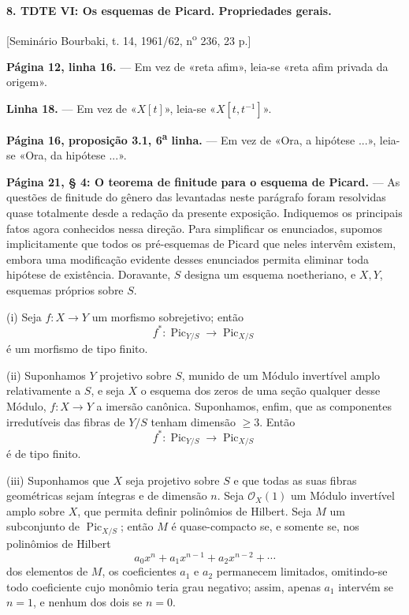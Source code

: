 \documentclass[11pt,twoside,openany]{book}
\numberwithin{equation}{section}
\newcommand{\src}[1]{%
  \phantomsection\hypertarget{src:#1}{}%
  \marginpar{\raggedleft\footnotesize\sffamily #1}%
}
\theoremstyle{plain}
\theoremstyle{definition}
\theoremstyle{remark}
\newcommand{\FgaUnitKey}{frontmatter}
\renewcommand{\src}[1]{%
  \phantomsection\hypertarget{src:\FgaUnitKey:#1}{}%
  \marginpar{\raggedleft\footnotesize\sffamily #1}%
}
\begin{document}
\noindent\textbf{8. TDTE VI: Os esquemas de Picard. Propriedades gerais.}

\begin{center}
[Seminário Bourbaki, t. 14, 1961/62, n\textsuperscript{o} 236, 23 p.]
\end{center}

\noindent\textbf{Página 12, linha 16.} --- Em vez de «reta afim», leia-se
«reta afim privada da origem».

\noindent\textbf{Linha 18.} --- Em vez de «$X[t]$», leia-se
«$X[t,t^{-1}]$».

\noindent\textbf{Página 16, proposição 3.1, 6\textsuperscript{a} linha.} ---
Em vez de «Ora, a hipótese ...», leia-se «Ora, da hipótese ...».

\noindent\textbf{Página 21, § 4: O teorema de finitude para o esquema de
Picard.} --- As questões de finitude do gênero das levantadas neste parágrafo
foram resolvidas quase totalmente desde a redação da presente exposição.
Indiquemos os principais fatos agora conhecidos nessa direção. Para simplificar
os enunciados, supomos implicitamente que todos os pré-esquemas de Picard que
neles intervêm existem, embora uma modificação evidente desses enunciados
permita eliminar toda hipótese de existência. Doravante, $S$ designa um esquema
noetheriano, e $X,Y$, esquemas próprios sobre $S$.

\medskip
\noindent(i) Seja $f:X\longrightarrow Y$ um morfismo sobrejetivo; então
\[
f^*: \operatorname{Pic}_{Y/S}\longrightarrow\operatorname{Pic}_{X/S}
\]
é um morfismo de tipo finito.
\src{304}
\noindent(ii) Suponhamos $Y$ projetivo sobre $S$, munido de um Módulo
invertível amplo relativamente a $S$, e seja $X$ o esquema dos zeros de uma
seção qualquer desse Módulo, $f:X\longrightarrow Y$ a imersão canônica.
Suponhamos, enfim, que as componentes irredutíveis das fibras de $Y/S$ tenham
dimensão $\geq3$. Então
\[
f^*: \operatorname{Pic}_{Y/S}\longrightarrow\operatorname{Pic}_{X/S}
\]
é de tipo finito.

\noindent(iii) Suponhamos que $X$ seja projetivo sobre $S$ e que todas as suas
fibras geométricas sejam íntegras e de dimensão $n$. Seja
$\mathcal O_X(1)$ um Módulo invertível amplo sobre $X$, que permita definir
polinômios de Hilbert. Seja $M$ um subconjunto de
$\operatorname{Pic}_{X/S}$; então $M$ é quase-compacto se, e somente se, nos
polinômios de Hilbert
\[
a_0x^n+a_1x^{n-1}+a_2x^{n-2}+\cdots
\]
dos elementos de $M$, os coeficientes $a_1$ e $a_2$ permanecem limitados, omitindo-se todo coeficiente cujo monômio teria grau negativo; assim, apenas $a_1$ intervém se $n=1$, e nenhum dos dois se $n=0$.
\end{document}
